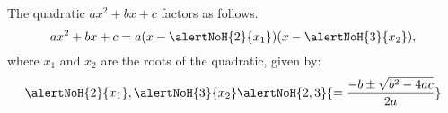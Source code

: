 \begin{frame}
\begin{theorem}
The quadratic $ax^2+bx+c$ factors as follows.
\[
ax^2+bx+c=a(x-\alertNoH{2}{x_1})(x-\alertNoH{3}{x_2}),
\]
where $x_1$ and $x_2$ are the roots of the quadratic, given by: 
\[
\alertNoH{2}{x_1}, \alertNoH{3}{x_2} \alertNoH{2,3}{=\frac{-b\pm \sqrt{b^2-4ac}}{2a}}
\]
\end{theorem}
\end{frame}